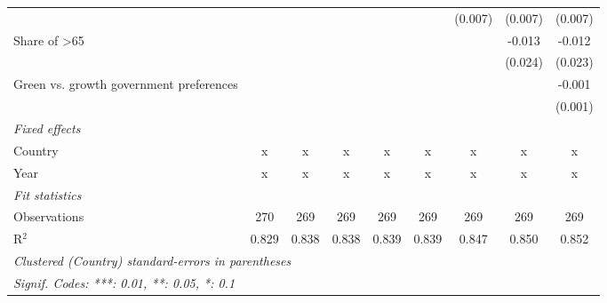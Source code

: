 \begin{table}[htbp]
\begin{tabular}{lcccccccc}
                                                      &         &         &         &         &         & (0.007) & (0.007) & (0.007)\\   
      Share of >65                                    &         &         &         &         &         &         & -0.013  & -0.012\\   
                                                      &         &         &         &         &         &         & (0.024) & (0.023)\\   
      Green vs. growth government preferences         &         &         &         &         &         &         &         & -0.001\\   
                                                      &         &         &         &         &         &         &         & (0.001)\\   
      \emph{Fixed effects}\\
      Country                                         & x       & x       & x       & x       & x       & x       & x       & x\\  
      Year                                            & x       & x       & x       & x       & x       & x       & x       & x\\  
      \midrule \emph{Fit statistics}\\
      Observations                                    & 270     & 269     & 269     & 269     & 269     & 269     & 269     & 269\\  
      R$^2$                                           & 0.829   & 0.838   & 0.838   & 0.839   & 0.839   & 0.847   & 0.850   & 0.852\\  
      \midrule
      \multicolumn{9}{l}{\emph{Clustered (Country) standard-errors in parentheses}}\\
      \multicolumn{9}{l}{\emph{Signif. Codes: ***: 0.01, **: 0.05, *: 0.1}}\\
   \end{tabular}
\end{table}


